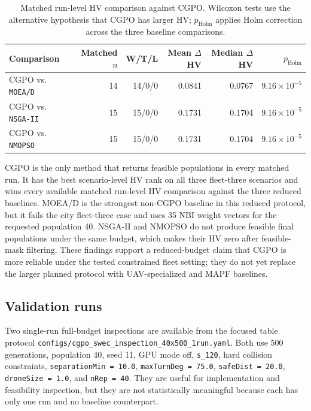 \documentclass[a4paper,fleqn]{cas-dc}
\begin{document}
\begin{table}[t]
\centering
\scriptsize
\caption{Matched run-level HV comparison against CGPO. Wilcoxon tests use the alternative hypothesis that CGPO has larger HV; $p_{\mathrm{Holm}}$ applies Holm correction across the three baseline comparisons.}
\label{tab:matched-pairwise}
\begin{tabular}{lrrrrr}
\toprule
Comparison & Matched $n$ & W/T/L & Mean $\Delta$HV & Median $\Delta$HV & $p_{\mathrm{Holm}}$ \\
\midrule
CGPO vs. \texttt{MOEA/D} & 14 & 14/0/0 & 0.0841 & 0.0767 & $9.16\times10^{-5}$ \\
CGPO vs. \texttt{NSGA-II} & 15 & 15/0/0 & 0.1731 & 0.1704 & $9.16\times10^{-5}$ \\
CGPO vs. \texttt{NMOPSO} & 15 & 15/0/0 & 0.1731 & 0.1704 & $9.16\times10^{-5}$ \\
\bottomrule
\end{tabular}
\end{table}

CGPO is the only method that returns feasible populations in every matched run. It has the best scenario-level HV rank on all three fleet-three scenarios and wins every available matched run-level HV comparison against the three reduced baselines. MOEA/D is the strongest non-CGPO baseline in this reduced protocol, but it fails the city fleet-three case and uses 35 NBI weight vectors for the requested population 40. NSGA-II and NMOPSO do not produce feasible final populations under the same budget, which makes their HV zero after feasible-mask filtering. These findings support a reduced-budget claim that CGPO is more reliable under the tested constrained fleet setting; they do not yet replace the larger planned protocol with UAV-specialized and MAPF baselines.

\subsection{Validation runs}

Two single-run full-budget inspections are available from the focused table protocol \texttt{configs/cgpo\_swec\_inspection\_40x500\_1run.yaml}. Both use 500 generations, population 40, seed 11, GPU mode off, \texttt{s\_120}, hard collision constraints, \texttt{separationMin = 10.0}, \texttt{maxTurnDeg = 75.0}, \texttt{safeDist = 20.0}, \texttt{droneSize = 1.0}, and \texttt{nRep = 40}. They are useful for implementation and feasibility inspection, but they are not statistically meaningful because each has only one run and no baseline counterpart.
\end{document}
